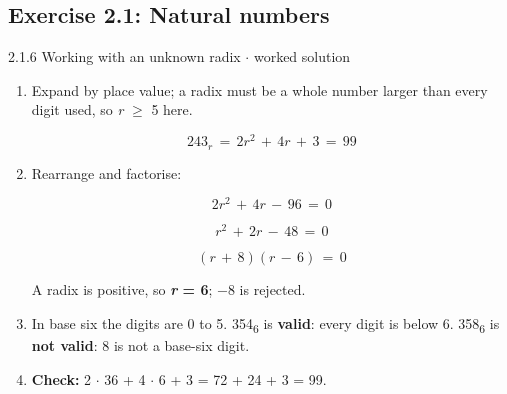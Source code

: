 \documentclass[11pt]{article}
\begin{document}
\begin{keepsection}\subsection{Exercise 2.1: Natural numbers}

\begin{workedbox}{2.1.6 Working with an unknown radix \ensuremath{\cdot} worked solution}
\begin{enumerate}
\item {}
Expand by place value; a radix must be a whole number larger than every digit used, so \textit{r} \ensuremath{\geq} 5 here.

\begin{equation*}243_{{r}}\, =\, 2{r}^{2}\, +\, 4{r}\, +\, 3\, =\, 99\end{equation*}
\item {}
Rearrange and factorise:

\begin{equation*}2{r}^{2}\, +\, 4{r}\, -\, 96\, =\, 0\end{equation*}

\begin{equation*}{r}^{2}\, +\, 2{r}\, -\, 48\, =\, 0\end{equation*}

\begin{equation*}({r}\, +\, 8)({r}\, -\, 6)\, =\, 0\end{equation*}

A radix is positive, so \textbf{\textit{r} = 6}; \ensuremath{-}8 is rejected.
\item In base six the digits are 0 to 5. 354\textsubscript{6} is \textbf{valid}: every digit is below 6. 358\textsubscript{6} is \textbf{not valid}: 8 is not a base-six digit.
\item \textbf{Check:} 2 \ensuremath{\cdot} 36 + 4 \ensuremath{\cdot} 6 + 3 = 72 + 24 + 3 = 99.
\end{enumerate}
\end{workedbox}

\end{keepsection}
\end{document}

